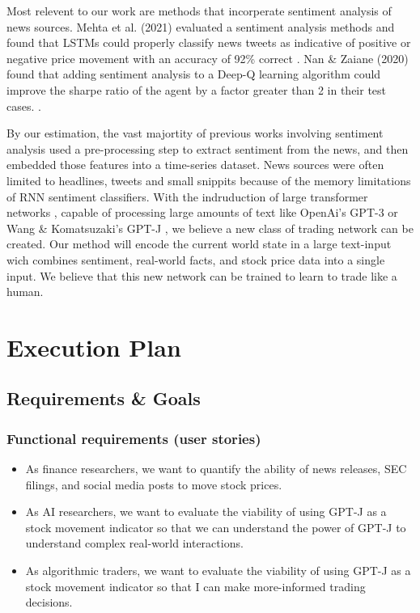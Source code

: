 \documentclass[conference]{IEEEtran}
\begin{document}
Most relevent to our work are methods that incorperate sentiment analysis of news sources. Mehta et al. (2021) evaluated a sentiment analysis methods and found that LSTMs could properly classify news tweets as indicative of positive or negative price movement with an accuracy of 92\% correct \cite{Mehta2021}. Nan \& Zaiane (2020) found that adding sentiment analysis to a Deep-Q learning algorithm could improve the sharpe ratio of the agent by a factor greater than 2 in their test cases. \cite{Nan2020}.

By our estimation, the vast majortity of previous works involving sentiment analysis used a pre-processing step to extract sentiment from the news, and then embedded those features into a time-series dataset. News sources were often limited to headlines, tweets and small snippits because of the memory limitations of RNN sentiment classifiers. With the indruduction of large transformer networks \cite{Vaswani2017}, capable of processing large amounts of text like OpenAi's GPT-3 \cite{Brown2020} or Wang \& Komatsuzaki's GPT-J \cite{gpt-j}, we believe a new class of trading network can be created. Our method will encode the current world state in a large text-input wich combines sentiment, real-world facts, and stock price data into a single input. We believe that this new network can be trained to learn to trade like a human.

\section{Execution Plan}
\subsection{Requirements \& Goals}
\subsubsection{Functional requirements (user stories)}
\begin{itemize}
	\item As finance researchers, we want to quantify the ability of news releases, SEC filings, and social media posts to move stock prices.
	\item As AI researchers, we want to evaluate the viability of using GPT-J as a stock movement indicator so that we can understand the power of GPT-J to understand complex real-world interactions.
	\item As algorithmic traders, we want to evaluate the viability of using GPT-J as a stock movement indicator so that I can make more-informed trading decisions.
\end{itemize}
\end{document}
